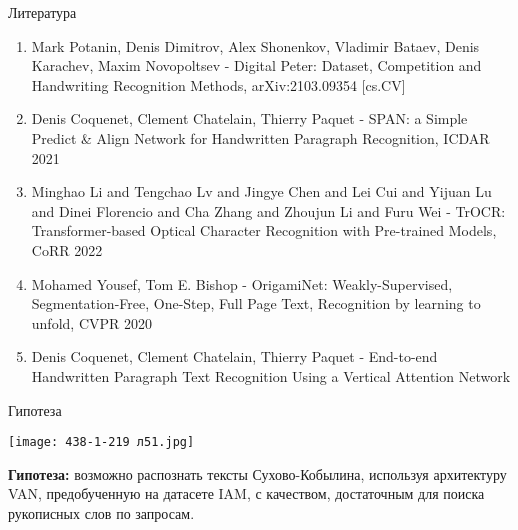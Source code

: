 \documentclass{beamer}
\begin{document}
\begin{frame}{Литература}
    \begin{enumerate}
        \item Mark Potanin, Denis Dimitrov, Alex Shonenkov, Vladimir Bataev, Denis Karachev,
Maxim Novopoltsev - Digital Peter: Dataset, Competition and Handwriting Recognition
Methods, arXiv:2103.09354 [cs.CV]
        \item Denis Coquenet, Clement Chatelain, Thierry Paquet - SPAN: a Simple Predict & Align
Network for Handwritten Paragraph Recognition, ICDAR 2021
        \item Minghao Li and Tengchao Lv and Jingye Chen and Lei Cui and Yijuan Lu and Dinei
Florencio and Cha Zhang and Zhoujun Li and Furu Wei - TrOCR: Transformer-based
Optical Character Recognition with Pre-trained Models, CoRR 2022
        \item Mohamed Yousef, Tom E. Bishop - OrigamiNet: Weakly-Supervised, Segmentation-Free,
One-Step, Full Page Text, Recognition by learning to unfold, CVPR 2020
        \item Denis Coquenet, Clement Chatelain, Thierry Paquet - End-to-end Handwritten
Paragraph Text Recognition Using a Vertical Attention Network
    \end{enumerate}
\end{frame}

\begin{frame}{Гипотеза}

\begin{minipage}{0.4\textwidth}
        \texttt{[image: 438-1-219 л51.jpg]}
    \end{minipage}%
    \hfill
    \begin{minipage}{0.6\textwidth}
        \textbf{Гипотеза:} возможно распознать тексты Сухово-Кобылина, используя архитектуру VAN, предобученную на датасете IAM, с качеством, достаточным для поиска рукописных слов по запросам.
    \end{minipage}
\end{frame}
\end{document}
